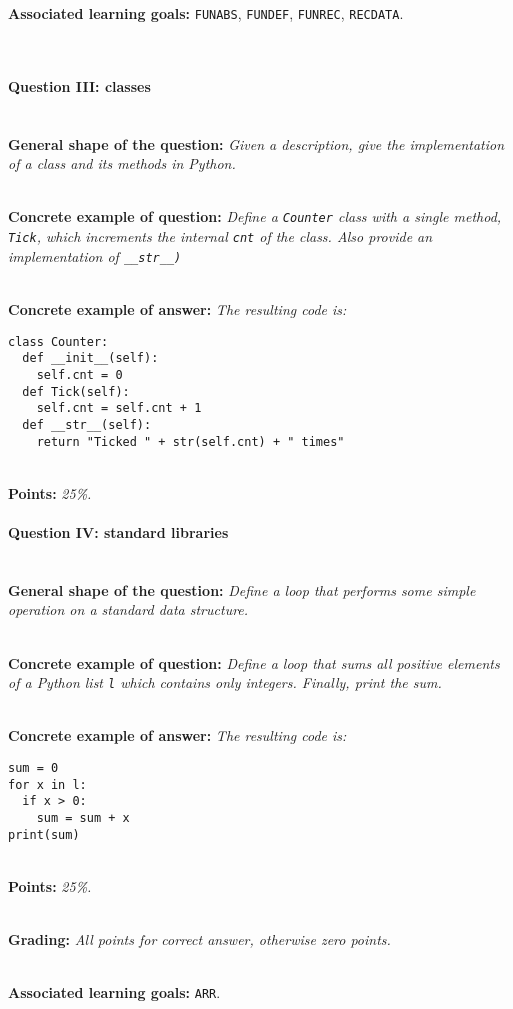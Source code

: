 \documentclass[10pt,a4paper]{article}
\begin{document}
\textbf{Associated learning goals:} \texttt{FUNABS}, \texttt{FUNDEF}, \texttt{FUNREC}, \texttt{RECDATA}.

\ \\ 

\paragraph{Question III: classes} \ \\

\textbf{General shape of the question:} \textit{Given a description, give the implementation of a class and its methods in Python.}

\ \\ 

\textbf{Concrete example of question:} \textit{Define a \texttt{Counter} class with a single method, \texttt{Tick}, which increments the internal \texttt{cnt} of the class. Also provide an implementation of \texttt{\_\_str\_\_)}}

\ \\ 

\textbf{Concrete example of answer:} \textit{The resulting code is:}

\begin{lstlisting}
class Counter:
  def __init__(self):
    self.cnt = 0
  def Tick(self):
    self.cnt = self.cnt + 1
  def __str__(self):
    return "Ticked " + str(self.cnt) + " times"
\end{lstlisting}

\ \\ 

\textbf{Points:} \textit{25\%.}

\paragraph{Question IV: standard libraries} \ \\

\textbf{General shape of the question:} \textit{Define a loop that performs some simple operation on a standard data structure.}

\ \\ 

\textbf{Concrete example of question:} \textit{Define a loop that sums all positive elements of a Python list \texttt{l} which contains only integers. Finally, print the sum.}

\ \\ 

\textbf{Concrete example of answer:} \textit{The resulting code is:}

\begin{lstlisting}
sum = 0
for x in l:
  if x > 0:
    sum = sum + x
print(sum)
\end{lstlisting}

\ \\ 

\textbf{Points:} \textit{25\%.}

\ \\ 

\textbf{Grading:} \textit{All points for correct answer, otherwise zero points.}

\ \\ 

\textbf{Associated learning goals:} \texttt{ARR}.

\ \\ 
\end{document}
